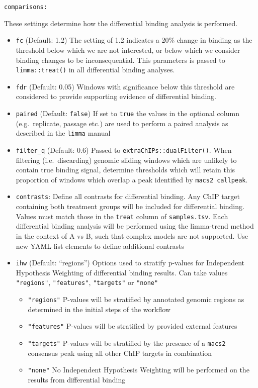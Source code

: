 \documentclass[
]{book}
\providecommand{\tightlist}{%
  \setlength{\itemsep}{0pt}\setlength{\parskip}{0pt}}
\begin{document}
\texttt{comparisons:}

These settings determine how the differential binding analysis is performed.

\begin{itemize}
\tightlist
\item
  \texttt{fc} (Default: 1.2) The setting of 1.2 indicates a 20\% change in binding as the threshold below which we are not interested, or below which we consider binding changes to be inconsequential. This parameters is passed to \texttt{limma::treat()} \citep{treat} in all differential binding analyses.
\item
  \texttt{fdr} (Default: 0.05) Windows with significance below this threshold are considered to provide supporting evidence of differential binding.
\item
  \texttt{paired} (Default: \texttt{false}) If set to \texttt{true} the values in the optional column (e.g.~replicate, passage etc.) are used to perform a paired analysis as described in the \texttt{limma} manual
\item
  \texttt{filter\_q} (Default: 0.6) Passed to \texttt{extraChIPs::dualFilter()}. When filtering (i.e.~discarding) genomic sliding windows which are unlikely to contain true binding signal, determine thresholds which will retain this proportion of windows which overlap a peak identified by \texttt{macs2\ callpeak}.
\item
  \texttt{contrasts}: Define all contrasts for differential binding. Any ChIP target containing both treatment groups will be included for differential binding. Values must match those in the \texttt{treat} column of \texttt{samples.tsv}. Each differential binding analysis will be performed using the limma-trend method in the context of A vs B, such that complex models are not supported. Use new YAML list elements to define additional contrasts
\item
  \texttt{ihw} (Default: ``regions'') Options used to stratify p-values for Independent Hypothesis Weighting\citep{ihw} of differential binding results. Can take values \texttt{"regions"}, \texttt{"features"}, \texttt{"targets"} or \texttt{"none"}

  \begin{itemize}
  \tightlist
  \item
    \texttt{"regions"} P-values will be stratified by annotated genomic regions as determined in the initial steps of the workflow
  \item
    \texttt{"features"} P-values will be stratified by provided external features
  \item
    \texttt{"targets"} P-values will be stratified by the presence of a \texttt{macs2} consensus peak using all other ChIP targets in combination
  \item
    \texttt{"none"} No Independent Hypothesis Weighting will be performed on the results from differential binding
  \end{itemize}
\end{itemize}
\end{document}
